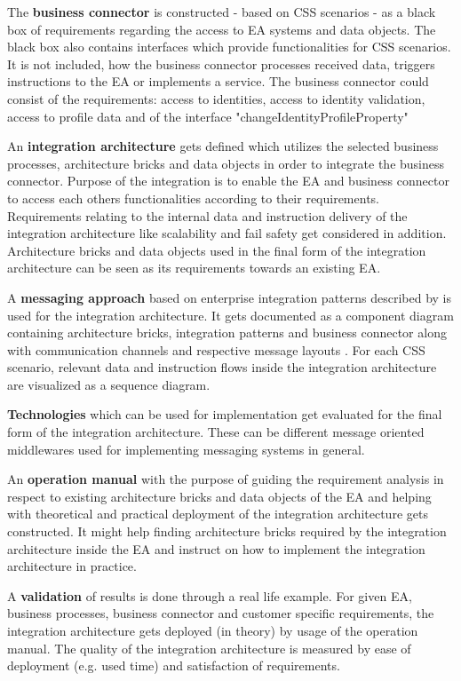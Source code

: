 \documentclass{article}
\begin{document}
The \textbf{business connector} is constructed - based on CSS scenarios - as a black box of requirements regarding 
the access to EA systems and data objects. The black box also contains interfaces which provide functionalities for CSS 
scenarios. It is not included, how the business 
connector processes received data, triggers instructions to the EA or implements a service.
The business connector could consist of the requirements: access to identities, access to identity validation, 
access to profile data and of the interface "changeIdentityProfileProperty"

An \textbf{integration architecture} gets defined which utilizes the selected business processes, architecture 
bricks and data objects in order to integrate the business connector. Purpose of the integration is to enable 
the EA and business connector to access each others functionalities according to their requirements.
Requirements relating to the internal data and instruction delivery of the integration architecture 
like scalability and fail safety get considered in addition.
Architecture bricks and data objects used in the final form of the 
integration architecture can be seen as its requirements towards an existing EA.

A \textbf{messaging approach} based on enterprise integration patterns described
by \textcite{integrationPatterns} is used for the integration architecture.
It gets documented as a component diagram
containing architecture bricks, integration patterns and business connector along with communication 
channels and respective message layouts \cite[cf. 16 ff.]{integrationPatterns}.
For each CSS scenario, relevant data and instruction flows inside the integration architecture 
are visualized as a sequence diagram.

\textbf{Technologies} which can be used for implementation get evaluated for the final form of the integration architecture.
These can be different message oriented middlewares used for implementing messaging systems in general.

An \textbf{operation manual} with the purpose of guiding the requirement analysis in respect to existing architecture bricks and data 
objects of the EA and helping with theoretical and practical deployment of the integration architecture gets constructed.
It might help finding architecture bricks required by the integration architecture inside the EA 
and instruct on how to implement the integration architecture in practice.

A \textbf{validation} of results is done through a real life example. For given 
EA, business processes, business connector and customer specific requirements, the integration architecture gets 
deployed (in theory) by usage of the operation manual.
The quality of the integration architecture is measured by ease of deployment (e.g. used time) and 
satisfaction of requirements.
\end{document}

